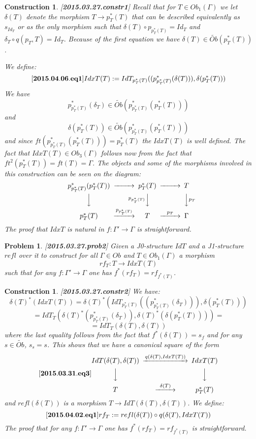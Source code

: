 \documentclass[12pt]{article}
\newenvironment{eq}{\begin{equation}}{\end{equation}}
\newtheorem{problem}[proposition]{Problem}
\newtheorem{construction}[proposition]{Construction}
\newcommand{\llabel}[1]{\label{#1}[{\bf #1}]}
\newcommand{\sr}{\rightarrow}
\newcommand{\wt}{\widetilde}
\begin{document}
\begin{construction}
\llabel{2015.03.27.constr1}\rm
Recall that for $T\in Ob_1(\Gamma)$ we let $\delta(T)$ denote the morphism $T\sr p_T^*(T)$ that can be described equivalently as $s_{Id_T}$ or as the only morphism such that $\delta(T)\circ p_{p_T^*(T)}=Id_T$ and $\delta_T\circ q(p_T,T)=Id_T$. Because of the first equation we have $\delta(T)\in \wt{Ob}(p_T^*(T))$. 

We define:
%
\begin{eq}
\llabel{2015.04.06.eq1}
IdxT(T):=IdT_{p_T^*(T)}((p_{p_T^*(T)}^*(\delta(T))), \delta(p_T^*(T)))
\end{eq}
%
We have
%
$$p_{p_T^*(T)}^*(\delta_T)\in \wt{Ob}(p_{p_T^*(T)}^*(p_T^*(T)))$$
%
and 
%
$$\delta(p_T^*(T))\in \wt{Ob}(p_{p_T^*(T)}^*(p_T^*(T)))$$
%
and since $ft(p_{p_T^*(T)}^*(p_T^*(T)))=p_T^*(T)$ the $IdxT(T)$ is well defined. The fact that $IdxT(T)\in Ob_3(\Gamma)$ follows now from the fact that $ft^2(p_T^*(T))=ft(T)=\Gamma$. The objects and some of the morphisms involved in this construction can be seen on the diagram: 
%
$$
\begin{CD}
p_{p_T^*(T)}^*(p_T^*(T)) @>>> p_T^*(T) @>>> T\\
@VVV @Vp_{p_T^*(T)} VV @VV p_TV\\
p_T^*(T) @>p_{p_T^*(T)}>> T @>p_T>> \Gamma
\end{CD}
$$
%
The proof that $IdxT$ is natural in $f:\Gamma'\sr \Gamma$ is straightforward.
\end{construction}
%
%
\begin{problem}
\llabel{2015.03.27.prob2}
Given a J0-structure $IdT$ and a J1-structure $refl$ over it to construct for all $\Gamma\in Ob$ and $T\in Ob_1(\Gamma)$ a morphism 
%
$$rf_T:T\sr IdxT(T)$$
%
such that for any $f:\Gamma'\sr \Gamma$ one has $f^*(rf_T)=rf_{f^*(T)}$. 
\end{problem}
%
\begin{construction}
\llabel{2015.03.27.constr2}\rm
We have:
%
$$\delta(T)^*(IdxT(T))=\delta(T)^*(IdT_{p_T^*(T)}((p_{p_T^*(T)}^*(\delta_T))),\delta(p_T^*(T)))$$
$$=IdT_T(\delta(T)^*(p_{p_T^*(T)}^*(\delta_T)),\delta(T)^*(\delta(p_T^*(T))))=$$
$$=IdT_T(\delta(T),\delta(T))$$
%
where the last equality follows from the fact that $f^*(\delta(T))=s_f$ and for any $s\in\wt{Ob}$, $s_s=s$.  This shows that we have a canonical square of the form
%
\begin{eq}
\llabel{2015.03.31.eq3}
\begin{CD}
IdT(\delta(T),\delta(T)) @>q(\delta(T),IdxT(T))>> IdxT(T)\\
@VVV @VVV\\
T @>\delta(T)>> p_T^*(T)
\end{CD}
\end{eq}
%
and $refl(\delta(T))$ is a morphism $T\sr IdT(\delta(T),\delta(T))$. We define:
%
\begin{eq}
\llabel{2015.04.02.eq1}
rf_T:=refl(\delta(T))\circ q(\delta(T),IdxT(T))
\end{eq}
%
The proof that for any $f:\Gamma'\sr \Gamma$ one has $f^*(rf_T)=rf_{f^*(T)}$ is straightforward. 
\end{construction}
\end{document}
